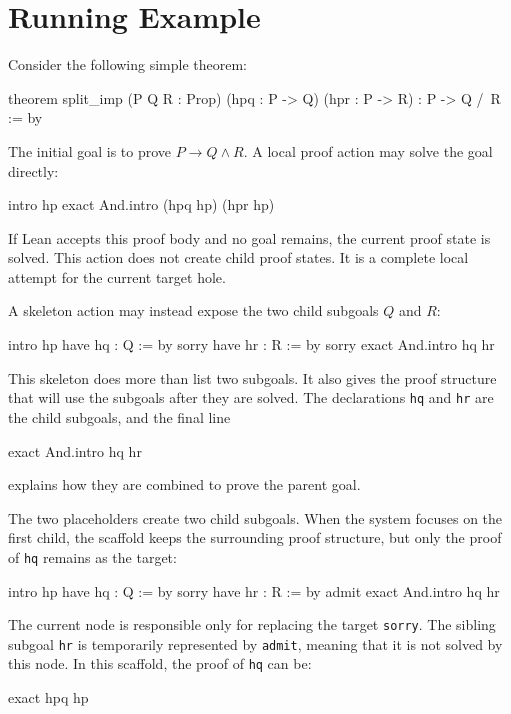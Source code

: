\chapter{Running Example}
\label{app:running-example}

Consider the following simple theorem:
\begin{leanblock}
theorem split_imp
(P Q R : Prop)
(hpq : P -> Q)
(hpr : P -> R) :
P -> Q /\ R := by
\end{leanblock}

The initial goal is to prove \(P \to Q \land R\). A local proof action may solve the goal directly:
\begin{leanblock}
intro hp
exact And.intro (hpq hp) (hpr hp)
\end{leanblock}

If Lean accepts this proof body and no goal remains, the current proof state is solved. This action does
not create child proof states. It is a complete local attempt for the current target hole.

A skeleton action may instead expose the two child subgoals \(Q\) and \(R\):
\begin{leanblock}
intro hp
have hq : Q := by
  sorry
have hr : R := by
  sorry
exact And.intro hq hr
\end{leanblock}

This skeleton does more than list two subgoals. It also gives the proof structure that will use the
subgoals after they are solved. The declarations \texttt{hq} and \texttt{hr} are the child subgoals, and
the final line
\begin{leanblock}
exact And.intro hq hr
\end{leanblock}
explains how they are combined to prove the parent goal.

The two placeholders create two child subgoals. When the system focuses on the first child, the scaffold
keeps the surrounding proof structure, but only the proof of \texttt{hq} remains as the target:
\begin{leanblock}
intro hp
have hq : Q := by
  sorry
have hr : R := by
  admit
exact And.intro hq hr
\end{leanblock}

The current node is responsible only for replacing the target \texttt{sorry}. The sibling subgoal
\texttt{hr} is temporarily represented by \texttt{admit}, meaning that it is not solved by this node. In this
scaffold, the proof of \texttt{hq} can be:
\begin{leanblock}
exact hpq hp
\end{leanblock}

